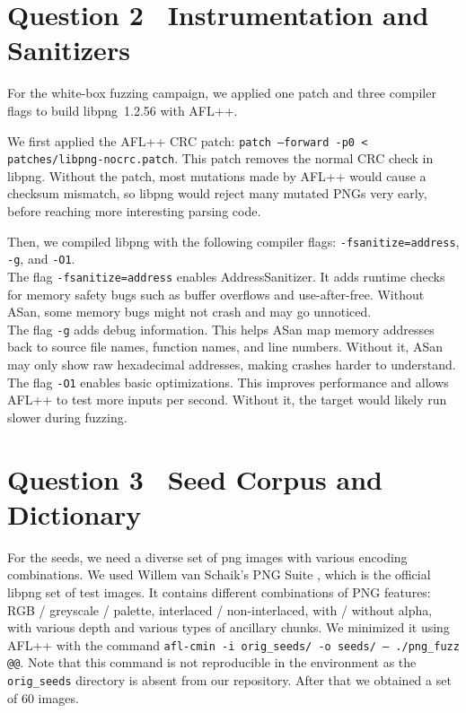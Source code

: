 \documentclass[letterpaper,twocolumn,10pt]{article}
\begin{document}
\section{Question 2 \textendash\ Instrumentation and Sanitizers}

For the white-box fuzzing campaign, we applied one patch and three compiler
flags to build libpng~1.2.56 with AFL++. 

We first applied the AFL++ CRC patch:
\texttt{patch --forward -p0 < patches/libpng-nocrc.patch}.
This patch removes the normal CRC check in libpng. Without the patch, most mutations made by AFL++ would cause a checksum mismatch, so libpng would reject many mutated PNGs very early, before reaching more interesting parsing code.

Then, we compiled libpng with the following compiler flags:
\texttt{-fsanitize=address}, \texttt{-g}, and \texttt{-O1}.
\\
The flag \texttt{-fsanitize=address} enables AddressSanitizer. It adds runtime
checks for memory safety bugs such as buffer overflows and use-after-free. Without ASan, some memory bugs might not crash and may go unnoticed.
\\
The flag \texttt{-g} adds debug information. This helps ASan map
memory addresses back to source file names, function names, and line numbers.
Without it, ASan may only show raw hexadecimal addresses, making crashes harder to understand.
\\
The flag \texttt{-O1} enables basic optimizations. This improves
performance and allows AFL++ to test more inputs per second. Without it, the target would likely run slower during fuzzing.

\section{Question 3 \textendash\ Seed Corpus and Dictionary}

For the seeds, we need a diverse set of png images with various encoding combinations. We used Willem van Schaik's PNG Suite \cite{seeds2}, which is the official libpng set of test images. It contains different combinations of PNG features: RGB / greyscale / palette, interlaced / non-interlaced, with / without alpha, with various depth and various types of ancillary chunks.
We minimized it using AFL++ with the command \texttt{afl-cmin -i orig\_seeds/ -o seeds/ -- ./png\_fuzz @@}. Note that this command is not reproducible in the environment as the \texttt{orig\_seeds} directory is absent from our repository. After that we obtained a set of 60 images.
\end{document}
